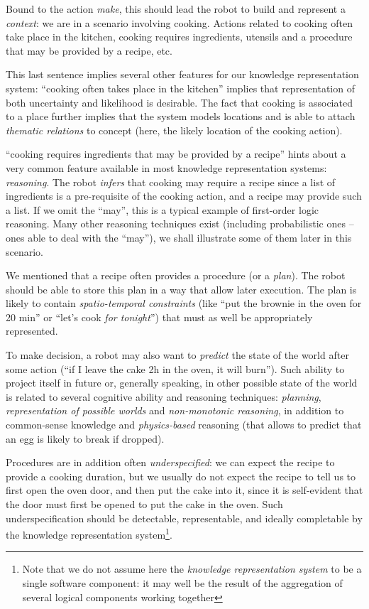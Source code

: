 \documentclass[a4paper, twocolumn]{article}
\begin{document}
Bound to the action \emph{make}, this should lead the robot to build and
represent a \emph{context}: we are in a scenario involving cooking. Actions
related to cooking often take place in the kitchen, cooking requires ingredients, 
utensils and a procedure that may be provided by a recipe, etc.

This last sentence implies several other features for our knowledge
representation system: ``cooking often takes place in the kitchen'' implies
that representation of both uncertainty and likelihood is desirable. The fact
that cooking is associated to a place further implies that the system models
locations and is able to attach \emph{thematic relations} to concept
(here, the likely location of the cooking action).

``cooking requires ingredients that may be provided by a recipe'' hints about a
very common feature available in most knowledge representation systems:
\emph{reasoning}. The robot \emph{infers} that cooking may require a recipe
since a list of ingredients is a pre-requisite of the cooking action, and a
recipe may provide such a list. If we omit the ``may'', this is a typical
example of first-order logic reasoning. Many other reasoning techniques exist
(including probabilistic ones -- ones able to deal with the ``may''), we shall
illustrate some of them later in this scenario.

We mentioned that a recipe often provides a procedure (or a \emph{plan}). The
robot should be able to store this plan in a way that allow later execution.
The plan is likely to contain \emph{spatio-temporal constraints} (like ``put
the brownie in the oven for 20 min'' or ``let's cook \emph{for tonight}'') that
must as well be appropriately represented.

To make decision, a robot may also want to \emph{predict} the state of the world
after some action (``if I leave the cake 2h in the oven, it will burn'').
Such ability to project itself in future or, generally speaking, in other
possible state of the world is related to several cognitive ability and
reasoning techniques: \emph{planning}, \emph{representation of possible worlds}
and \emph{non-monotonic reasoning}, in addition to common-sense knowledge and
\emph{physics-based} reasoning (that allows to predict that an egg is likely to
break if dropped).

Procedures are in addition often \emph{underspecified}: we can expect the recipe
to provide a cooking duration, but we usually do not expect the recipe to tell
us to first open the oven door, and then put the cake into it, since it is
self-evident that the door must first be opened to put the cake in the oven.
Such underspecification should be detectable, representable, and ideally
completable by the knowledge representation system\footnote{Note that we do not
assume here the {\it knowledge representation system} to be a single software
component: it may well be the result of the aggregation of several logical
components working together}.
\end{document}
